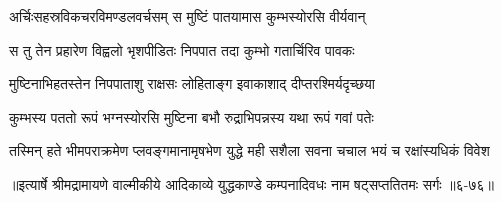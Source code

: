 \twolineshloka
{अर्चिःसहस्रविकचरविमण्डलवर्चसम्}
{स मुष्टिं पातयामास कुम्भस्योरसि वीर्यवान्} %

\twolineshloka
{स तु तेन प्रहारेण विह्वलो भृशपीडितः}
{निपपात तदा कुम्भो गतार्चिरिव पावकः} %

\twolineshloka
{मुष्टिनाभिहतस्तेन निपपाताशु राक्षसः}
{लोहिताङ्ग इवाकाशाद् दीप्तरश्मिर्यदृच्छया} %

\twolineshloka
{कुम्भस्य पततो रूपं भग्नस्योरसि मुष्टिना}
{बभौ रुद्राभिपन्नस्य यथा रूपं गवां पतेः} %

\twolineshloka
{तस्मिन् हते भीमपराक्रमेण प्लवङ्गमानामृषभेण युद्धे}
{मही सशैला सवना चचाल भयं च रक्षांस्यधिकं विवेश} %


॥इत्यार्षे श्रीमद्रामायणे वाल्मीकीये आदिकाव्ये युद्धकाण्डे कम्पनादिवधः नाम षट्सप्ततितमः सर्गः ॥६-७६॥
